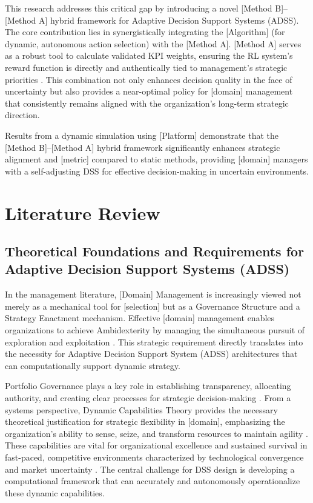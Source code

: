 \documentclass[10pt,twocolumn]{article}
\begin{document}
This research addresses this critical gap by introducing a novel
[Method B]--[Method A] hybrid framework for Adaptive Decision
Support Systems (ADSS). The core contribution lies in
synergistically integrating the [Algorithm] (for dynamic,
autonomous action selection) with the [Method A]. [Method A]
serves as a robust tool to calculate validated KPI weights,
ensuring the RL system's reward function is directly and
authentically tied to management's strategic priorities
\citep{Author2011}. This combination not only enhances decision
quality in the face of uncertainty but also provides a near-optimal
policy for [domain] management that consistently remains aligned
with the organization's long-term strategic direction.

Results from a dynamic simulation using [Platform] demonstrate
that the [Method B]--[Method A] hybrid framework significantly
enhances strategic alignment and [metric] compared to static
methods, providing [domain] managers with a self-adjusting DSS for
effective decision-making in uncertain environments.

\section{Literature Review}

\subsection{Theoretical Foundations and Requirements for Adaptive
Decision Support Systems (ADSS)}

In the management literature, [Domain] Management is increasingly
viewed not merely as a mechanical tool for [selection] but as a
Governance Structure and a Strategy Enactment mechanism. Effective
[domain] management enables organizations to achieve Ambidexterity
by managing the simultaneous pursuit of exploration and
exploitation \citep{Author2010}. This strategic requirement
directly translates into the necessity for Adaptive Decision
Support System (ADSS) architectures that can computationally
support dynamic strategy.

Portfolio Governance plays a key role in establishing
transparency, allocating authority, and creating clear processes
for strategic decision-making \citep{Author1999}. From a systems
perspective, Dynamic Capabilities Theory provides the necessary
theoretical justification for strategic flexibility in [domain],
emphasizing the organization's ability to sense, seize, and
transform resources to maintain agility \citep{Author2007}. These
capabilities are vital for organizational excellence and sustained
survival in fast-paced, competitive environments characterized by
technological convergence and market uncertainty \citep{Author2016c}.
The central challenge for DSS design is developing a computational
framework that can accurately and autonomously operationalize these
dynamic capabilities.
\end{document}
